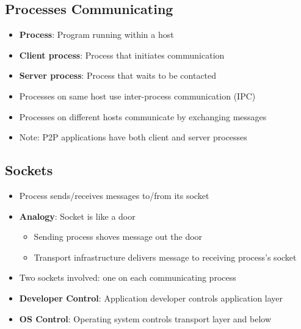 \documentclass[12pt]{article}
\begin{document}
\subsection{Processes Communicating}
\begin{itemize}
    \item \textbf{Process}: Program running within a host
    \item \textbf{Client process}: Process that initiates communication
    \item \textbf{Server process}: Process that waits to be contacted
    \item Processes on same host use inter-process communication (IPC)
    \item Processes on different hosts communicate by exchanging messages
    \item Note: P2P applications have both client and server processes
\end{itemize}

\subsection{Sockets}
\begin{itemize}
    \item Process sends/receives messages to/from its socket
    \item \textbf{Analogy}: Socket is like a door
          \begin{itemize}
              \item Sending process shoves message out the door
              \item Transport infrastructure delivers message to receiving process's socket
          \end{itemize}
    \item Two sockets involved: one on each communicating process
    \item \textbf{Developer Control}: Application developer controls application layer
    \item \textbf{OS Control}: Operating system controls transport layer and below
\end{itemize}
\end{document}
